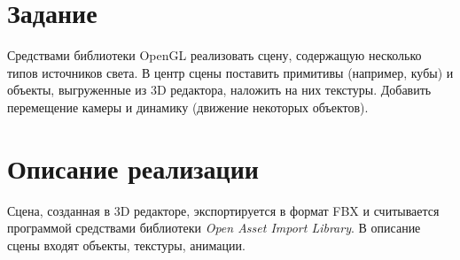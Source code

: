 \documentclass[listings]{labreport}
\begin{document}
\maketitlepage

\section*{Задание}

Средствами библиотеки OpenGL реализовать сцену, содержащую несколько типов источников
света. В центр сцены поставить примитивы (например, кубы) и объекты, выгруженные из 3D редактора,
наложить на них текстуры. Добавить перемещение камеры и динамику (движение некоторых объектов).

\section*{Описание реализации}

Сцена, созданная в 3D редакторе, экспортируется в формат FBX и считывается
программой средствами библиотеки \textit{Open Asset Import Library}. В описание сцены
входят объекты, текстуры, анимации.
\end{document}
